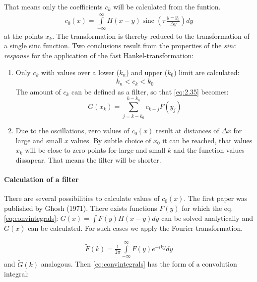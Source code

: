 \begin{compactenum}[1)]
That means only the coefficients $c_k$ will be calculated from the funtion.
\begin{align}
c_0(x)=\int\limits_{-\infty}^{\infty}H(x-y)\operatorname{sinc}\left(\pi\frac{y-y_0}{\Delta y}\right) dy
\end{align}
at the points $x_k$.
The transformation is thereby reduced to the transformation of a single sinc function. Two conclusions result from the properties of the \textit{sinc response} for the application of the fast Hankel-transformation:
\begin{enumerate}
\item Only $c_k$ with values over a lower ($k_n$) and upper ($k_0$) limit are calculated:
\begin{align*}
k_n<c_k<k_0
\end{align*}
The amount of $c_k$ can be defined as a filter, so that \eqref{eq:2.35} becomes:
\begin{equation}
G(x_k)=\sum_{j=k-k_0}^{k-k_n}c_{k-j}F(y_j)
\end{equation}
\item Due to the oscillations, zero values of $c_0(x)$ result at distances of $\Delta x$ for large and small $x$ values. By subtle choice of $x_0$ it can be reached, that values $x_k$ will be close to zero points for large and small $k$ and the function values dissapear. That means the filter will be shorter.
\end{enumerate}
\end{compactenum}

\paragraph{Calculation of a filter}
There are several possibilities to calculate values of $c_0(x)$. The first paper was published by Ghosh (1971). There exists functions $F(y)$ for which the eq. \eqref{eq:convintegrals}: $G(x)=\int F(y)H(x-y)dy$ can be solved analytically and $G(x)$ can be calculated. For such cases we apply the Fourier-transformation.

\begin{align*}
\tilde{F}(k)=\frac{1}{2\pi}\int\limits_{-\infty}^{\infty}F(y)e^{-iky}dy
\end{align*}
and $\tilde{G}(k)$ analogous. Then \eqref{eq:convintegrals} has the form of a convolution integral:

